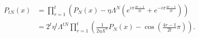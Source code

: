 \begin{equation}
 \begin{split}
P_{tN}(x) &=\prod \limits_{r=1}^{t} \left( P_{N}(x) - \eta \Lambda^{N} \left( e^{i \pi \frac{4r-1}{2t}} + e^{-i \pi \frac{4r-1}{2t}}   \right) \right) \\
          &= 2^t \eta^t \Lambda^{tN} \prod \limits_{r=1}^{t} \left( \frac{1}{2 \eta \Lambda^{N} } P_{N}(x) - \cos(\frac{4r-1}{2t}\pi) \right).
 \end{split}
\end{equation}

